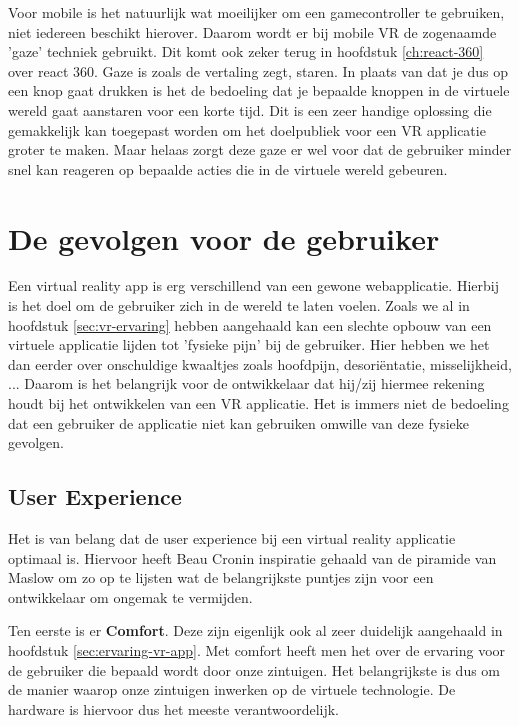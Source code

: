 Voor mobile is het natuurlijk wat moeilijker om een gamecontroller te gebruiken, niet iedereen beschikt hierover. Daarom wordt er bij mobile VR de zogenaamde 'gaze' techniek gebruikt. Dit komt ook zeker terug in hoofdstuk \ref{ch:react-360} over react 360. Gaze is zoals de vertaling zegt, staren. In plaats van dat je dus op een knop gaat drukken is het de bedoeling dat je bepaalde knoppen in de virtuele wereld gaat aanstaren voor een korte tijd. Dit is een zeer handige oplossing die gemakkelijk kan toegepast worden om het doelpubliek voor een VR applicatie groter te maken. Maar helaas zorgt deze gaze er wel voor dat de gebruiker minder snel kan reageren op bepaalde acties die in de virtuele wereld gebeuren.

\section{De gevolgen voor de gebruiker}
\label{sec:gevolgen-vr}
Een virtual reality app is erg verschillend van een gewone webapplicatie. Hierbij is het doel om de gebruiker zich in de wereld te laten voelen. Zoals we al in hoofdstuk \ref{sec:vr-ervaring} hebben aangehaald kan een slechte opbouw van een virtuele applicatie lijden tot 'fysieke pijn' bij de gebruiker. Hier hebben we het dan eerder over onschuldige kwaaltjes zoals hoofdpijn, desoriëntatie, misselijkheid, ... Daarom is het belangrijk voor de ontwikkelaar dat hij/zij hiermee rekening houdt bij het ontwikkelen van een VR applicatie. Het is immers niet de bedoeling dat een gebruiker de applicatie niet kan gebruiken omwille van deze fysieke gevolgen.

\subsection{User Experience}
\label{subsec:user-experience}
Het is van belang dat de user experience bij een virtual reality applicatie optimaal is. Hiervoor heeft Beau Cronin \autocite{Cronin2015} inspiratie gehaald van de piramide van Maslow om zo op te lijsten wat de belangrijkste puntjes zijn voor een ontwikkelaar om ongemak te vermijden.

Ten eerste is er \textbf{Comfort}. Deze zijn eigenlijk ook al zeer duidelijk aangehaald in hoofdstuk \ref{sec:ervaring-vr-app}. Met comfort heeft men het over de ervaring voor de gebruiker die bepaald wordt door onze zintuigen. Het belangrijkste is dus om de manier waarop onze zintuigen inwerken op de virtuele technologie. De hardware is hiervoor dus het meeste verantwoordelijk.

